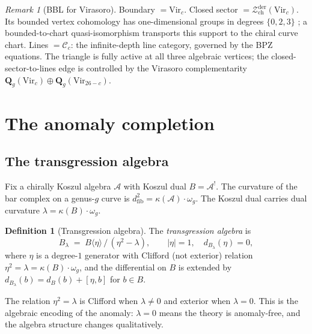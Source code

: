 \documentclass[11pt,reqno]{amsart}
\theoremstyle{definition}
\newtheorem{definition}[theorem]{Definition}
\theoremstyle{remark}
\newtheorem{remark}[theorem]{Remark}
\newcommand{\cA}{\mathcal{A}}
\newcommand{\cC}{\mathcal{C}}
\newcommand{\cZ}{\mathcal{Z}}
\newcommand{\Vir}{\mathrm{Vir}}
\numberwithin{equation}{section}
\begin{document}
\begin{remark}[BBL for Virasoro]\label{rem:bbl-vir}
Boundary $= \Vir_c$. Closed sector
$= \cZ^{\mathrm{der}}_{\mathrm{ch}}(\Vir_c)$.  Its bounded vertex
cohomology has one-dimensional groups in degrees $\{0,2,3\}$
\cite[Theorem~7.2]{BDSK21}; a bounded-to-chart quasi-isomorphism
transports this support to the chiral curve chart. Lines
$= \cC_c$: the infinite-depth line category, governed by the BPZ
equations. The triangle is fully active at all three algebraic
vertices; the closed-sector-to-lines edge is controlled by the Virasoro
complementarity $\mathbf{Q}_g(\Vir_c) \oplus
\mathbf{Q}_g(\Vir_{26-c})$.
\end{remark}


\section{The anomaly completion}\label{sec:anomaly}


\subsection{The transgression algebra}\label{subsec:transgression}

Fix a chirally Koszul algebra $\cA$ with Koszul dual
$B = \cA^!$. The curvature of the bar complex on a genus-$g$
curve is $d^2_{\mathrm{fib}} = \kappa(\cA) \cdot \omega_g$. The
Koszul dual carries dual curvature
$\lambda = \kappa(B) \cdot \omega_g$.

\begin{definition}[Transgression algebra]\label{def:transgression}
The \emph{transgression algebra} is
\begin{equation}\label{eq:transgression}
B_\lambda
\;=\;
B\langle\eta\rangle \,\big/\,
(\eta^2 - \lambda),
\qquad
|\eta| = 1,
\quad
d_{B_\lambda}(\eta) = 0,
\end{equation}
where $\eta$ is a degree-$1$ generator with Clifford (not
exterior) relation $\eta^2 = \lambda = \kappa(B) \cdot \omega_g$,
and the differential on $B$ is extended by
$d_{B_\lambda}(b) = d_B(b) + [\eta, b]$ for $b \in B$.
\end{definition}

The relation $\eta^2 = \lambda$ is Clifford when $\lambda \neq 0$
and exterior when $\lambda = 0$. This is the algebraic encoding of
the anomaly: $\lambda = 0$ means the theory is anomaly-free, and
the algebra structure changes qualitatively.
\end{document}
